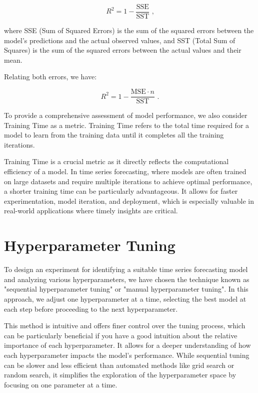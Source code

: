 \begin{equation}
R^2 = 1 - \frac{\text{SSE}}{\text{SST}}  \text{ ,}
\end{equation}

where SSE (Sum of Squared Errors) is the sum of the squared errors between the model's predictions and the actual observed values, and SST (Total Sum of Squares) is the sum of the squared errors between the actual values and their mean.

Relating both errors, we have:

\begin{equation}
R^2 = 1 - \frac{\text{MSE} \cdot n}{\text{SST}}  \text{ .}
\end{equation}

To provide a comprehensive assessment of model performance, we also consider Training Time as a metric. Training Time refers to the total time required for a model to learn from the training data until it completes all the training iterations.

Training Time is a crucial metric as it directly reflects the computational efficiency of a model. In time series forecasting, where models are often trained on large datasets and require multiple iterations to achieve optimal performance, a shorter training time can be particularly advantageous. It allows for faster experimentation, model iteration, and deployment, which is especially valuable in real-world applications where timely insights are critical.

\section{Hyperparameter Tuning}

To design an experiment for identifying a suitable time series forecasting model and analyzing various hyperparameters, we have chosen the technique known as "sequential hyperparameter tuning" or "manual hyperparameter tuning". In this approach, we adjust one hyperparameter at a time, selecting the best model at each step before proceeding to the next hyperparameter.

This method is intuitive and offers finer control over the tuning process, which can be particularly beneficial if you have a good intuition about the relative importance of each hyperparameter. It allows for a deeper understanding of how each hyperparameter impacts the model's performance. While sequential tuning can be slower and less efficient than automated methods like grid search or random search, it simplifies the exploration of the hyperparameter space by focusing on one parameter at a time.

